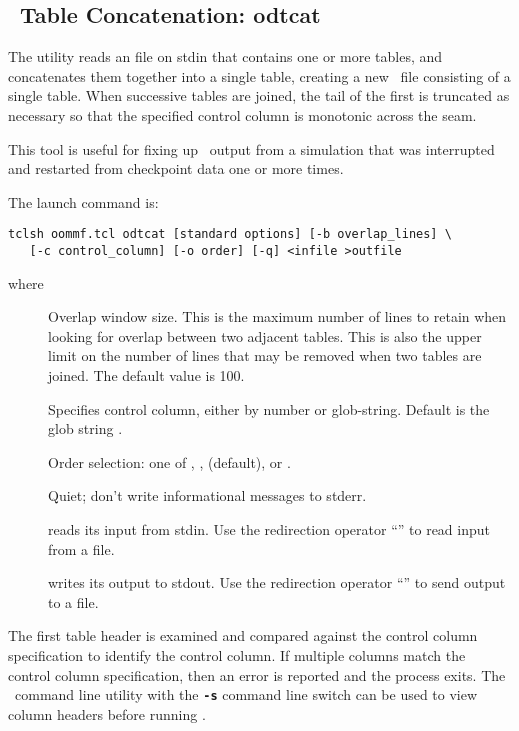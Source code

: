 
\subsection{\ODT\ Table Concatenation: odtcat}\label{sec:odtcat}%

The  utility reads an
 file on stdin that
contains one or more tables, and concatenates them together into a
single table, creating a new \ODT\ file consisting of a single table.
When successive tables are joined, the tail of the first is truncated as
necessary so that the specified control column is monotonic across the
seam.

This tool is useful for fixing up \ODT\ output from a simulation that
was interrupted and restarted from checkpoint data one or more times.

The  launch command is:
\begin{verbatim}
tclsh oommf.tcl odtcat [standard options] [-b overlap_lines] \
   [-c control_column] [-o order] [-q] <infile >outfile
\end{verbatim}
where
\begin{description}
\item[]
  Overlap window size.  This is the maximum number of lines to retain
  when looking for overlap between two adjacent tables.  This is also
  the upper limit on the number of lines that may be removed when
  two tables are joined.  The default value is 100.
\item[]
  Specifies control column, either by number or glob-string.  Default
  is the glob string
  .
\item[\optkey{-o order}]
  Order selection: one of , , 
  (default), or \cd{none}.
\item[]
  Quiet; don't write informational messages to stderr.
\item[]
   reads its input from stdin.  Use the redirection operator
  ``\boa'' to read input from a file.
\item[]
   writes its output to stdout.  Use the redirection operator
  ``\bca'' to send output to a file.
\end{description}
The first table header is examined and compared against the control
column specification to identify the control column.  If multiple
columns match the control column specification, then an error is
reported and the process exits.  The \OOMMF\ command line utility
{}
with the \texttt{\textbf{-s}} command line switch can be used to view
column headers before running \app{odtcat}.

